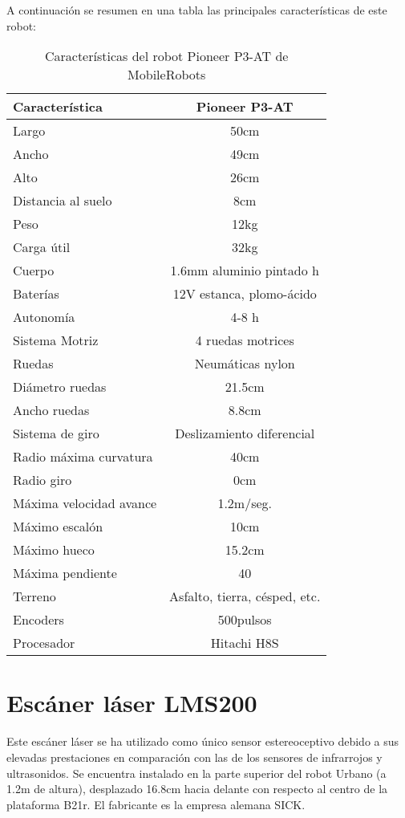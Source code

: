 A continuación se resumen en una tabla las principales características de este robot:
\begin{table}[h]
\begin{center}
\begin{tabular}{|l|c|} \hline
Característica & Pioneer P3-AT\\
\hline
\hline
Largo & 50cm\\
\hline
Ancho & 49cm\\
\hline
Alto & 26cm\\
\hline
Distancia al suelo & 8cm\\
\hline
Peso & 12kg\\
\hline
Carga útil & 32kg\\
\hline
Cuerpo & 1.6mm aluminio pintado h\\
\hline
Baterías & 12V estanca, plomo-ácido\\
\hline
\hline
Autonomía & 4-8 h\\
\hline
Sistema Motriz & 4 ruedas motrices\\
\hline
Ruedas &  Neumáticas nylon\\
\hline
\hline
Diámetro ruedas & 21.5cm\\
\hline
Ancho ruedas & 8.8cm\\
\hline
Sistema de giro & Deslizamiento diferencial\\
\hline
Radio máxima curvatura & 40cm\\
\hline
Radio giro & 0cm\\
\hline
\hline
Máxima velocidad avance & 1.2m/seg.\\
\hline
Máximo escalón & 10cm\\
\hline
Máximo hueco & 15.2cm\\
\hline
Máxima pendiente & 40\\
\hline
Terreno & Asfalto, tierra, césped, etc.\\
\hline
Encoders & 500pulsos\\
\hline
Procesador & Hitachi H8S\\
\hline
\end{tabular}
\end{center}
\caption{Características del robot Pioneer P3-AT de MobileRobots}
\end{table}



\clearpage
\section{Escáner láser LMS200}\label{laser}
Este escáner láser se ha utilizado como único sensor estereoceptivo debido a sus elevadas prestaciones en comparación con las de los sensores de infrarrojos y ultrasonidos. Se encuentra instalado en la parte superior del robot Urbano (a 1.2m de altura), desplazado 16.8cm hacia delante con respecto al centro de la plataforma B21r. El fabricante es la empresa alemana SICK.

